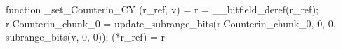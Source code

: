 function _set_Counterin_CY (r_ref, v) = {
    r = __bitfield_deref(r_ref);
    r.Counterin_chunk_0 = update_subrange_bits(r.Counterin_chunk_0, 0, 0, subrange_bits(v, 0, 0));
    (*r_ref) = r
}
